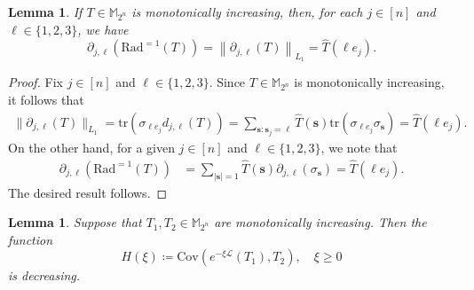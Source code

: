 \documentclass{amsbook}
\newtheorem{lemma}[theorem]{Lemma}
\theoremstyle{definition}
\theoremstyle{remark}
\numberwithin{section}{chapter}
\numberwithin{equation}{chapter}
\newcommand{\M}{\mathbb{M}}
\newcommand{\1}{\mathbf{1}}
\newcommand{\s}{\mathbf{s}}
\begin{document}
\begin{lemma}\label{l1-norm}
If $T\in \mathbb{M}_{2^n}$ is monotonically increasing, then, for each $j\in [n]$ and $\ell\in\{1,2,3\}$, we have
\begin{equation*}
	\partial_{j,\ell}\left(\mathrm{Rad}^{=1}(T)\right)=\left\|\partial_{j,\ell}(T)\right\|_{L_{1}}=\widehat{T}(\ell e_j).
\end{equation*}	
\end{lemma}


\begin{proof}Fix $j\in [n]$ and  $\ell\in\{1,2,3\}$.  Since  $T\in \mathbb{M}_{2^n}$ is monotonically increasing, it follows that
	\begin{align*}
	\|\partial_{j,\ell}(T)\|_{L_{1}}
		=\mathrm{tr}(\sigma_{\ell e_j}d_{j,\ell}(T))
		=\sum_{\s:\s_j=\ell} \widehat{T}(\s) \mathrm{tr}(\sigma_{\ell e_j}\sigma_{\s})
		=\widehat{T}(\ell e_j).
	\end{align*}
On the other hand, for a given $j\in [n]$ and $\ell\in\{1,2,3\}$, we note that
	\begin{equation*}\label{positive-1}
		\begin{split}
			\partial_{j,\ell}\left(\mathrm{Rad}^{=1}(T)\right)&=\sum_{|\s|=1}\widehat{T}(\s)\partial_{j,\ell}(\sigma_{\s})
=\widehat{T}(\ell e_j).
		\end{split}
	\end{equation*}
The desired result follows.
\end{proof}


\begin{lemma}\label{h-xi}
	 Suppose that $T_1, T_2\in \M_{2^{n}}$ are monotonically increasing. Then the function
	 $$H(\xi)\coloneqq\mathrm{Cov}\left(e^{-\xi\mathcal L}(T_1),T_2\right),\quad \xi\geq 0$$
	 is decreasing. 
\end{lemma}
\end{document}
